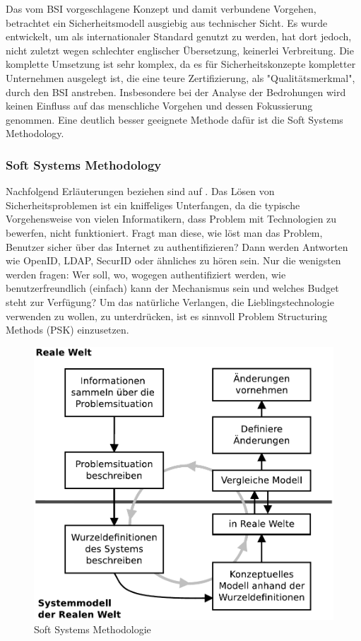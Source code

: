 \documentclass[11pt,a4paper]{report}
\begin{document}
Das vom BSI vorgeschlagene Konzept und damit verbundene Vorgehen, betrachtet ein Sicherheitsmodell ausgiebig aus technischer Sicht. Es wurde entwickelt, um als internationaler Standard genutzt zu werden, hat dort jedoch, nicht zuletzt wegen schlechter englischer Übersetzung, keinerlei Verbreitung. Die komplette Umsetzung ist sehr komplex, da es für Sicherheitskonzepte kompletter Unternehmen ausgelegt ist, die eine teure Zertifizierung, als "Qualitätsmerkmal", durch den BSI anstreben. Insbesondere bei der Analyse der Bedrohungen wird keinen Einfluss auf das menschliche Vorgehen und dessen Fokussierung genommen. Eine deutlich besser geeignete Methode dafür ist die Soft Systems Methodology.

\subsubsection{Soft Systems Methodology} \label{sec:ssm}

Nachfolgend Erläuterungen beziehen sind auf \cite{gutmann9}. 
Das Lösen von Sicherheitsproblemen ist ein kniffeliges Unterfangen, da die typische Vorgehensweise von vielen Informatikern, dass Problem mit Technologien zu bewerfen, nicht funktioniert. Fragt man diese, wie löst man das Problem, Benutzer sicher über das Internet zu authentifizieren? Dann werden Antworten wie OpenID, LDAP, SecurID oder ähnliches zu hören sein. Nur die wenigsten werden fragen: Wer soll, wo, wogegen authentifiziert werden, wie benutzerfreundlich (einfach) kann der Mechanismus sein und welches Budget steht zur Verfügung? Um das natürliche Verlangen, die Lieblingstechnologie verwenden zu wollen, zu unterdrücken, ist es sinnvoll Problem Structuring Methods (PSK) einzusetzen.

\begin{figure}[htbp]
\centering
\includegraphics[scale=0.6]{images/ssm.pdf}
\caption{Soft Systems Methodologie}
\label{fig:ssm}
\end{figure}
\end{document}
